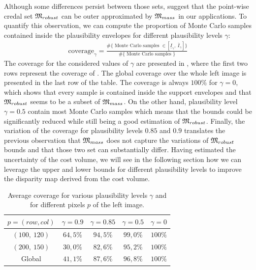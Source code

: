 Although some differences persist between those sets,  suggest that the point-wise credal set $\mathfrak{M}_{robust}$ can be outer approximated by $\mathfrak{M}_{mass}$ in our applications. To quantify this observation, we can compute the proportion of Monte Carlo samples contained inside the plausibility envelopes for different plausibility levels $\gamma$:
\begin{align}
    \textrm{coverage}_\gamma = \frac{\#\{\textrm{ Monte Carlo samples }\in[\underline{I}_\gamma,~\overline{I}_\gamma]\}}{\#\{\textrm{ Monte Carlo samples }\}}
\end{align}
The coverage for the considered values of $\gamma$ are presented in , where the first two rows represent the coverage of . The global coverage over the whole left image is presented in the last row of the table. The coverage is always $100\%$ for $\gamma=0$, which shows that every sample is contained inside the support envelopes and that $\mathfrak{M}_{robust}$ seems to be a subset of $\mathfrak{M}_{mass}$. On the other hand, plausibility level $\gamma=0.5$ contain most Monte Carlo samples which means that the bounds could be significantly reduced while still being a good estimation of $\mathfrak{M}_{robust}$. Finally, the variation of the coverage for plausibility levels $0.85$ and $0.9$ translates the previous observation that $\mathfrak{M}_{mass}$ does not capture the variations of $\mathfrak{M}_{robust}$ bounds and that those two set can substantially differ. Having estimated the uncertainty of the cost volume, we will see in the following section how we can leverage the upper and lower bounds for different plausibility levels to improve the disparity map derived from the cost volume.  

\begin{table}[ht]
\centering
\begin{tabular}{|c|c|c|c|c|}
\hline
\rowcolor[HTML]{C0C0C0}
$p=(row,col)$ & $\gamma=0.9$  & $\gamma=0.85$ & $\gamma=0.5$  & $\gamma=0$   \\ \hline
\cellcolor[HTML]{C0C0C0}$(100,~120)$     & $64,5\%$ & $94,5\%$ & $99,0\%$ & $100\%$ \\ \hline
\cellcolor[HTML]{C0C0C0}$(200,~150)$     & $30,0\%$ & $82,6\%$ & $95,2\%$ & $100\%$ \\ \hline
\cellcolor[HTML]{C0C0C0}Global        & $41,1\%$ & $87,6\%$ & $96,8\%$ & $100\%$ \\ \hline
\end{tabular}
\caption{Average coverage for various plausibility levels $\gamma$ and for different pixels $p$ of the left image.}\label{tab:Coverage}
\end{table}

